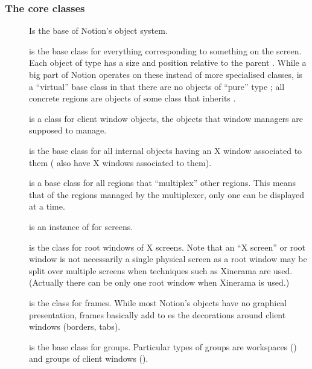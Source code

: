 \subsubsection{The core classes}

\begin{description}
  \item[]
    Is the base of Notion's object system.

  \item[]
    is the base class for everything corresponding to something on the
    screen. Each object of type  has a size and  position
    relative to the parent . While a big part of Notion 
    operates on these instead of more specialised classes, 
    is a ``virtual''  base class in that there are no objects of ``pure''
    type ; all concrete regions are objects of some class 
    that inherits .

  \item[] is a class for
    client window objects, the objects that window managers are
    supposed to manage.

  \item[] is the base class for all
    internal objects having an X window associated to them
    ( also have X windows associated to them).
    
  \item[] is a base class for all regions that ``multiplex'' 
    other regions. This means that of the regions managed by the multiplexer,
    only one can be displayed at a time. 
  
  \item[] is an instance of 
    for screens.
    
  \item[] is the class for
    root windows of X screens.
    Note that an ``X screen'' or root window is not necessarily a
    single physical screen as a root window
    may be split over multiple screens when techniques such as 
    Xinerama are used. (Actually there can be only 
    one root window when Xinerama is used.) 
    
  \item[] is the class for frames.
    While most Notion's objects have no graphical presentation, frames 
    basically add to es the decorations around client 
    windows (borders, tabs).
    
  \item[] is the base class for groups.
    Particular types of groups are workspaces 
    ()
    and groups of client windows
    ().
\end{description}



